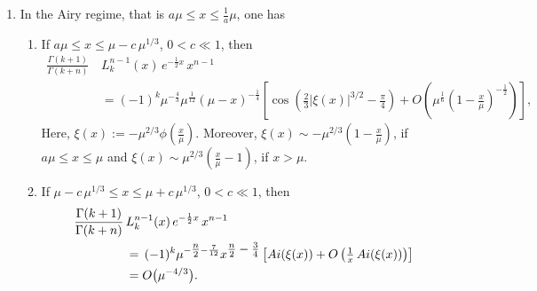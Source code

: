 \documentclass[10pt,a4paper]{amsart}
\begin{document}
\begin{lemma}
\begin{enumerate}
\begin{enumerate}
\begin{equation}
\begin{split}
       \end{split}
    \end{equation}      
    \end{enumerate}
     \item[\emph{(2)}] In the Airy regime, that is $a \mu \leq x \leq \frac{1}{a} \mu$,  one has
     \begin{enumerate}
 \item [\emph{(\emph{a})}] \hspace*{.7mm} If $ a \mu \leq x \leq  \mu - c \, \mu^{1/3}$, $0 < c \ll 1$, then    
 \begin{equation} \label{Bessel-Airy interface}
        \begin{split}
            \frac{\Gamma(k+1)}{\Gamma(k+n)} \,   & L^{n-1}_{k}(x) \, e^{- \frac{1}{2} x} \,  x^{n-1} \\
            & = (-1)^k \mu^{- \frac{4}{3} } \mu^{\frac{1}{12}} (\mu - x)^{-\frac{1}{4}}   \left[  \cos \left( {  \textstyle\frac{2}{3} |\xi(x)|^{3/2}  - \frac{\pi}{4} }     \right) + O \left( { \textstyle  \mu^{  \frac{1}{6}} \left( 1 - \frac{x}{\mu}  \right)^{- \frac{1}{2}} } \right)  \right],
        \end{split}
    \end{equation} 
    Here, $\xi(x) :=  - \mu^{2/3} \phi({\textstyle \frac{x}{\mu}})$. Moreover,    $ \xi(x) \sim - \mu^{2/3} \left( 1 - {\textstyle \frac{x}{\mu}}  \right)$, if $a \mu \leq x \leq \mu$ and $ \xi(x) \sim  \mu^{2/3} \left(  {\textstyle \frac{x}{\mu}}  -1 \right)$, if $x > \mu$.
 \item [\emph{(\emph{b})}] \hspace*{.7mm} If $ \mu - c \, \mu^{1/3} \leq x \leq \mu + c \, \mu^{1/3}$, $0 < c \ll 1$, then
    \begin{equation} \label{around mu}
        \begin{split}
            \frac{\Gamma(k+1)}{\Gamma(k+n)} \,   & L^{n-1}_{k}(x) \, e^{- \frac{1}{2} x} \,  x^{n-1} \\
            & = \, (-1)^{k} \mu^{{-\textstyle\frac{n}{2}} - \frac{7}{12} }  x^{ {\textstyle\frac{n}{2} - \frac{3}{4}} } \left[ \emph{Ai}( \xi(x))   +  O \left( {\textstyle \frac{1}{x} } \, \emph{Ai}( \xi(x)) \right)  \right]\\
            &= O \big(  \mu^{{-4/3 }  } \big).
        \end{split}
    \end{equation}  
    

\end{enumerate}
\end{enumerate}
\end{lemma}
\end{document}
